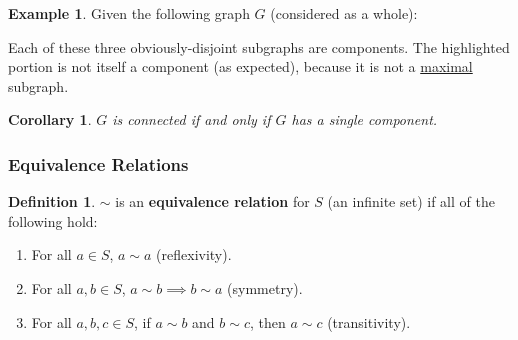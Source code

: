 \documentclass[]{article}
\newtheorem*{corollary}{Corollary}
\theoremstyle{definition}
\newtheorem*{defn}{Definition}
\newtheorem{ex}{Example}[section]
\begin{document}
				\begin{ex}
					Given the following graph $G$ (considered as a whole):
					\begin{center}
					\end{center}

					Each of these three obviously-disjoint subgraphs are components. The highlighted portion is not itself a component (as expected), because it is not a \underline{maximal} subgraph.
				\end{ex}

				\begin{corollary}
					$G$ is connected if and only if $G$ has a single component.
				\end{corollary}

			\subsubsection{Equivalence Relations}
				\begin{defn}
					$\mathbf{\sim}$ is an \textbf{equivalence relation} for $S$ (an infinite set) if all of the following hold:
					\begin{enumerate}
						\item For all $a \in S$, $a \sim a$ (reflexivity).
						\item For all $a, b \in S$, $a \sim b \implies b \sim a$ (symmetry).
						\item For all $a, b, c \in S$, if $a \sim b$ and $b \sim c$, then $a \sim c$ (transitivity).
					\end{enumerate}
				\end{defn}
\end{document}
